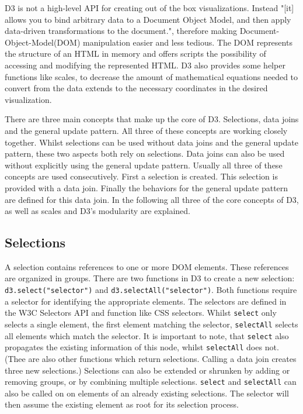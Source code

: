 D3 is not a high-level API for creating out of the box visualizations. Instead "[it] allows you to bind arbitrary data to a Document Object Model, and then apply data-driven transformations to the document."\cite{d3js}, therefore making Document-Object-Model(DOM) manipulation easier and less tedious. The DOM represents the structure of an HTML in memory and offers scripts the possibility of accessing and modifying the represented HTML. D3 also provides some helper functions like scales, to decrease the amount of mathematical equations needed to convert from the data extends to the necessary coordinates in the desired visualization.

There are three main concepts that make up the core of D3. Selections, data joins and the general update pattern. All three of these concepts are working closely together. Whilst selections can be used without data joins and the general update pattern, these two aspects both rely on selections. Data joins can also be used without explicitly using the general update pattern. Usually all three of these concepts are used consecutively. First a selection is created. This selection is provided with a data join. Finally the behaviors for the general update pattern are defined for this data join.
In the following all three of the core concepts of D3, as well as scales and D3's modularity are explained.

\subsection{Selections}


A selection contains references to one or more DOM elements. These references are organized in groups. There are two functions in D3 to create a new selection: \verb|d3.select("selector")| and \verb|d3.selectAll("selector")|. Both functions require a selector for identifying the appropriate elements. The selectors are defined in the W3C Selectors API\cite{w3c_selectors_api} and function like CSS selectors. Whilst \verb|select| only selects a single element, the first element matching the selector, \verb|selectAll| selects all elements which match the selector. It is important to note, that \verb|select| also propagates the existing information of this node, whilst \verb|selectAll| does not. (Thee are also other functions which return selections. Calling a data join creates three new selections.) Selections can also be extended or shrunken by adding or removing groups, or by combining multiple selections. \verb|select| and \verb|selectAll| can also be called on on elements of an already existing selections. The selector will then assume the existing element as root for its selection process.

